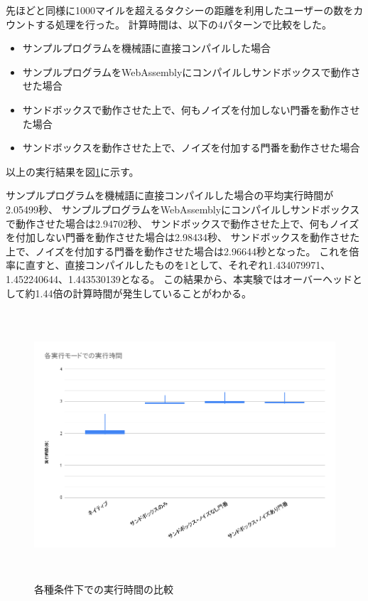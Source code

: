 \documentclass[a4paper,11pt]{jreport}
\begin{document}
先ほどと同様に1000マイルを超えるタクシーの距離を利用したユーザーの数をカウントする処理を行った。
計算時間は、以下の4パターンで比較をした。
\begin{itemize}
    \item サンプルプログラムを機械語に直接コンパイルした場合
    \item サンプルプログラムをWebAssemblyにコンパイルしサンドボックスで動作させた場合
    \item サンドボックスで動作させた上で、何もノイズを付加しない門番を動作させた場合
    \item サンドボックスを動作させた上で、ノイズを付加する門番を動作させた場合
\end{itemize}

以上の実行結果を図\ref{fig:time}に示す。

サンプルプログラムを機械語に直接コンパイルした場合の平均実行時間が2.05499秒、
サンプルプログラムをWebAssemblyにコンパイルしサンドボックスで動作させた場合は2.94702秒、
サンドボックスで動作させた上で、何もノイズを付加しない門番を動作させた場合は2.98434秒、
サンドボックスを動作させた上で、ノイズを付加する門番を動作させた場合は2.96644秒となった。
これを倍率に直すと、直接コンパイルしたものを1として、それぞれ1.434079971、1.452240644、1.443530139となる。
この結果から、本実験ではオーバーヘッドとして約1.44倍の計算時間が発生していることがわかる。

\begin{figure}[htbp]
    \centering
\includegraphics[height=100mm]{time.png}
    \caption{各種条件下での実行時間の比較}
    \label{fig:time}
\end{figure}
\end{document}
